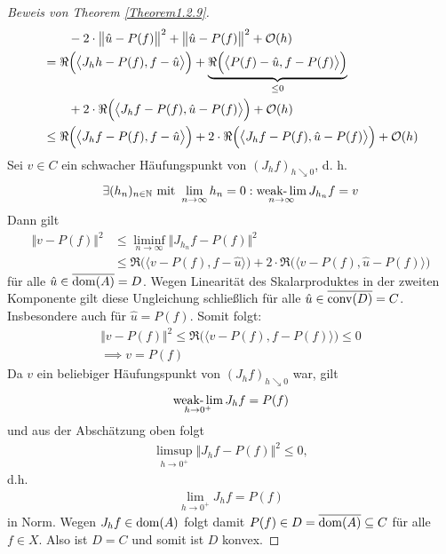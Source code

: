 \begin{proof}[Beweis von Theorem \ref{Theorem1.2.9}]
\begin{align*}
		&\qquad-2\cdot\big\Vert\hat{u}-P(f)\big\Vert^2+\big\Vert\hat{u}-P(f)\big\Vert^2+\mathcal{O}(h)\\
		&=\Re\Big(\big\langle J_h h-P(f),f-\hat{u}\big\rangle\Big)
		+\underbrace{\Re\Big(\big\langle P(f)-\hat{u},f-P(f)\big\rangle\Big)}_{\leq0}\\
		&\qquad+2\cdot\Re\Big(\big\langle J_h f-P(f),\hat{u}-P(f)\big\rangle\Big)+\mathcal{O}(h)\\
		&\leq
		\Re\Big(\big\langle J_h f-P(f),f-\hat{u}\big\rangle\Big)
		+2\cdot\Re\Big(\big\langle J_h f-P(f),\hat{u}-P(f)\big\rangle\Big)+\mathcal{O}(h)
	\end{align*}
	Sei $v\in C$ ein schwacher Häufungspunkt von $(J_h f)_{h\searrow 0}$, d. h.
	\begin{align*}
		\exists (h_n)_{n\in\mathbb{N}}\text{ mit } \lim\limits_{n\to\infty} h_n=0:\operatorname*{\text{weak-}\lim}\limits_{n\to\infty} J_{h_n} f=v
	\end{align*}
	Dann gilt
	\begin{align*}
		\Vert v-P(f)\Vert^2 
		&\leq\liminf\limits_{n\to\infty}\big\Vert J_{h_n} f-P(f)\big\Vert^2\\
		&\leq
		\Re\Big(\big\langle v-P(f),f-\hat{u}\big\rangle\Big)
		+2\cdot\Re\Big(\big\langle v-P(f),\hat{u}-P(f)\big\rangle\Big)
	\end{align*}
	für alle $\hat{u}\in\overline{\operatorname{dom}(A)}=D$.
	Wegen Linearität des Skalarproduktes in der zweiten Komponente gilt diese Ungleichung schließlich für alle $\hat{u}\in\overline{\operatorname{conv}(D)}=C$.
	Insbesondere auch für $\hat{u}=P(f)$. 
	Somit folgt:
	\begin{align*}
		\big\Vert v-P(f)\big\Vert^2
		\leq
		\Re\Big(\big\langle v-P(f),f-P(f)\big\rangle\Big)
		\leq0\\
		\implies
		v=P(f)
	\end{align*}
	Da $v$ ein beliebiger Häufungspunkt von $(J_h f)_{h\searrow 0}$ war, gilt 
	\begin{align*}
		\operatorname*{\text{weak-}\lim}\limits_{h\to0^+} J_h f=P(f)
	\end{align*}
	und aus der Abschätzung oben folgt 
	\begin{align*}
		\limsup\limits_{h\to 0^+}\big\Vert J_h f-P(f)\big\Vert^2
		\leq
		0,
	\end{align*}
	d.h. 
	\begin{align*}
		\lim\limits_{h\to 0^+} J_h f=P(f)
	\end{align*}
	in Norm. 
	Wegen $J_h f\in\operatorname{dom}(A)$ folgt damit $P(f)\in D=\overline{\operatorname{dom}(A)}\subseteq C$ für alle $f\in X$. 
	Also ist $D=C$ und somit ist $D$ konvex.
\end{proof}

